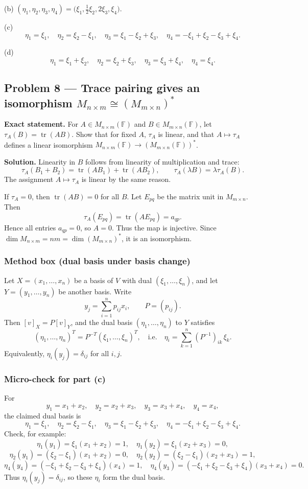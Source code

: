 \documentclass[12pt,a4paper]{article}
\theoremstyle{plain}
\theoremstyle{definition}      %
\begin{document}
(b) \((\eta_1,\eta_2,\eta_3,\eta_4)=\big(\xi_1,\tfrac12\xi_2,2\xi_3,\xi_4\big).\)

(c)
\[
\eta_1=\xi_1,\quad
\eta_2=\xi_2-\xi_1,\quad
\eta_3=\xi_1-\xi_2+\xi_3,\quad
\eta_4=-\xi_1+\xi_2-\xi_3+\xi_4.
\]

(d)
\[
\eta_1=\xi_1+\xi_2,\quad
\eta_2=\xi_2+\xi_3,\quad
\eta_3=\xi_3+\xi_4,\quad
\eta_4=\xi_4.
\]

\subsection*{Problem 8 — Trace pairing gives an isomorphism \(M_{n\times m}\cong (M_{m\times n})^*\)}

\textbf{Exact statement.}
For \(A\in M_{n\times m}(\mathbb F)\) and \(B\in M_{m\times n}(\mathbb F)\), let \(\tau_A(B)=\operatorname{tr}(AB)\).
Show that for fixed \(A\), \(\tau_A\) is linear, and that \(A\mapsto \tau_A\) defines a linear isomorphism
\(M_{n\times m}(\mathbb F)\to (M_{m\times n}(\mathbb F))^*\).

\textbf{Solution.}
Linearity in \(B\) follows from linearity of multiplication and trace:
\[
\tau_A(B_1+B_2)=\operatorname{tr}(AB_1)+\operatorname{tr}(AB_2),\qquad
\tau_A(\lambda B)=\lambda\tau_A(B).
\]
The assignment \(A\mapsto\tau_A\) is linear by the same reason.

If \(\tau_A=0\), then \(\operatorname{tr}(AB)=0\) for all \(B\). Let \(E_{pq}\) be the matrix unit in \(M_{m\times n}\). Then
\[
\tau_A(E_{pq})=\operatorname{tr}(AE_{pq})=a_{qp}.
\]
Hence all entries \(a_{qp}=0\), so \(A=0\). Thus the map is injective.
Since \(\dim M_{n\times m}=nm=\dim (M_{m\times n})^*\), it is an isomorphism.

\subsubsection*{Method box (dual basis under basis change)}
Let \(X=(x_1,\dots,x_n)\) be a basis of \(V\) with dual \((\xi_1,\dots,\xi_n)\), and let
\(Y=(y_1,\dots,y_n)\) be another basis. Write
\[
y_j=\sum_{i=1}^n p_{ij}x_i,\qquad P=(p_{ij}).
\]
Then \([v]_X=P[v]_Y\), and the dual basis \((\eta_1,\dots,\eta_n)\) to \(Y\) satisfies
\[
(\eta_1,\dots,\eta_n)^T = P^{-T}(\xi_1,\dots,\xi_n)^T,
\quad\text{i.e.}\quad
\eta_i=\sum_{k=1}^n (P^{-1})_{ik}\,\xi_k.
\]
Equivalently, \(\eta_i(y_j)=\delta_{ij}\) for all \(i,j\).

\subsubsection*{Micro-check for part (c)}
For
\[
y_1=x_1+x_2,\quad y_2=x_2+x_3,\quad y_3=x_3+x_4,\quad y_4=x_4,
\]
the claimed dual basis is
\[
\eta_1=\xi_1,\quad
\eta_2=\xi_2-\xi_1,\quad
\eta_3=\xi_1-\xi_2+\xi_3,\quad
\eta_4=-\xi_1+\xi_2-\xi_3+\xi_4.
\]
Check, for example:
\[
\eta_1(y_1)=\xi_1(x_1+x_2)=1,\quad \eta_1(y_2)=\xi_1(x_2+x_3)=0,
\]
\[
\eta_2(y_1)=(\xi_2-\xi_1)(x_1+x_2)=0,\quad
\eta_2(y_2)=(\xi_2-\xi_1)(x_2+x_3)=1,
\]
\[
\eta_4(y_4)=(-\xi_1+\xi_2-\xi_3+\xi_4)(x_4)=1,\quad
\eta_4(y_3)=(-\xi_1+\xi_2-\xi_3+\xi_4)(x_3+x_4)=0.
\]
Thus \(\eta_i(y_j)=\delta_{ij}\), so these \(\eta_i\) form the dual basis.
\end{document}
